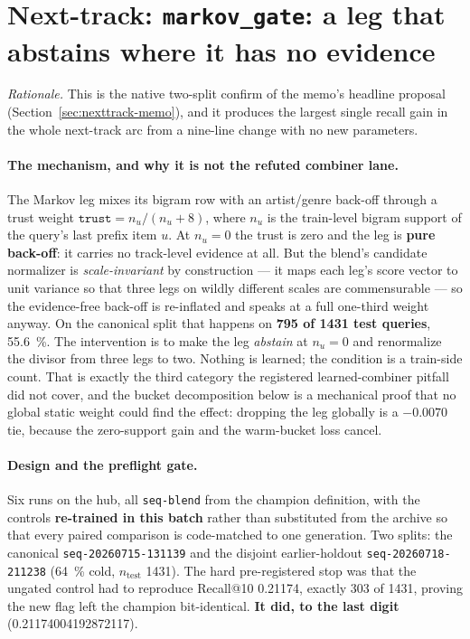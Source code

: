 \documentclass[11pt]{article}
\newcommand{\dsid}[1]{\texttt{\small #1}}
\begin{document}
\section{Next-track: \texttt{markov\_gate}: a leg that abstains where it has no evidence}
\label{sec:nexttrack-markovgate}
\emph{Rationale.} This is the native two-split confirm of the memo's headline
proposal (Section~\ref{sec:nexttrack-memo}), and it produces the largest single recall gain
in the whole next-track arc from a nine-line change with no new parameters.

\paragraph{The mechanism, and why it is not the refuted combiner lane.} The Markov
leg mixes its bigram row with an artist/genre back-off through a trust weight
$\texttt{trust} = n_u/(n_u+8)$, where $n_u$ is the train-level bigram support of
the query's last prefix item $u$. At $n_u = 0$ the trust is zero and the leg is
\textbf{pure back-off}: it carries no track-level evidence at all. But the blend's
candidate normalizer is \emph{scale-invariant} by construction --- it maps each
leg's score vector to unit variance so that three legs on wildly different scales
are commensurable --- so the evidence-free back-off is re-inflated and speaks at a
full one-third weight anyway. On the canonical split that happens on \textbf{\num{795}
of \num{1431} test queries}, \SI{55.6}{\percent}. The intervention is to make the
leg \emph{abstain} at $n_u = 0$ and renormalize the divisor from three legs to two.
Nothing is learned; the condition is a train-side count. That is exactly the third
category the registered learned-combiner pitfall did not cover, and the bucket
decomposition below is a mechanical proof that no global static weight could find
the effect: dropping the leg globally is a $-\num{0.0070}$ tie, because the
zero-support gain and the warm-bucket loss cancel.

\paragraph{Design and the preflight gate.} Six runs on the hub, all
\texttt{seq-blend} from the champion definition, with the controls
\textbf{re-trained in this batch} rather than substituted from the archive so that
every paired comparison is code-matched to one generation. Two splits: the
canonical \dsid{seq-20260715-131139} and the disjoint earlier-holdout
\dsid{seq-20260718-211238} (\SI{64}{\percent} cold, $n_{\mathrm{test}}$
\num{1431}). The hard pre-registered stop was that the ungated control had to
reproduce Recall@10 \num{0.21174}, exactly \num{303} of \num{1431}, proving the new
flag left the champion bit-identical. \textbf{It did, to the last digit}
(\num{0.21174004192872117}).
\end{document}
